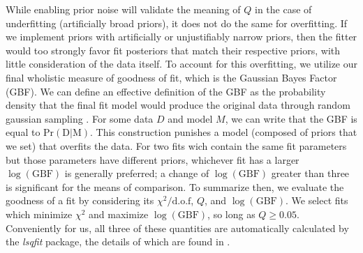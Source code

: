 While enabling prior noise will validate the meaning of $Q$ in the case of underfitting (artificially broad priors), it does not do the same for overfitting.  If we implement priors with artificially or unjustifiably narrow priors, then the fitter would too strongly favor fit posteriors that match their respective priors, with little consideration of the data itself.  To account for this overfitting, we utilize our final wholistic measure of goodness of fit, which is the Gaussian Bayes Factor (GBF).  We can define an effective definition of the GBF as the probability density that the final fit model would produce the original data through random gaussian sampling \cite{GBF}.  For some data $D$ and model $M$, we can write that the GBF is equal to $\mathrm{Pr(D|M)}$.  This construction punishes a model (composed of priors that we set) that overfits the data. For two fits wich contain the same fit parameters but those parameters have different priors, whichever fit has a larger  $\log(\mathrm{GBF})$ is generally preferred; a change of $\log(\mathrm{GBF})$ greater than three is significant \cite{bayes_Kass_Rafferty} for the means of comparison.  To summarize then, we evaluate the goodness of a fit by considering its $\chi^2/\mathrm{d.o.f}$, $Q$, and $\log(\mathrm{GBF})$.  We select fits which minimize $\chi^2$ and maximize $\log(\mathrm{GBF})$, so long as $Q\geq0.05$.  Conveniently for us, all three of these quantities are automatically calculated by the \textit{lsqfit} package, the details of which are found in \cite{peter_lepage_2024_12690493}.






